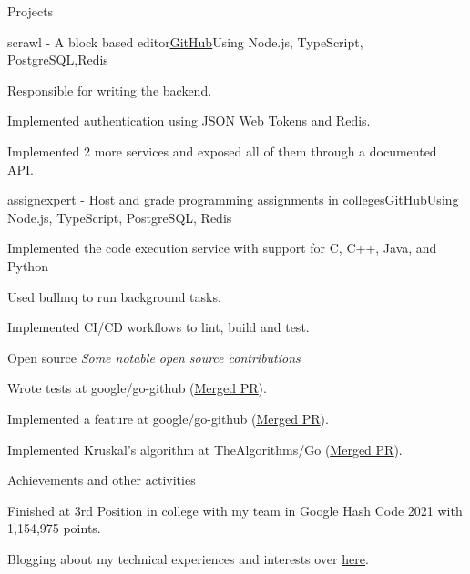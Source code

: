 \documentclass{resume} %
\begin{document}
\begin{rSection}{Projects}

\begin{rSubsection}{scrawl - A block based editor}{\href{https://github.com/taskmasterorg/server}{\underline{GitHub}}}{Using Node.js, TypeScript, PostgreSQL,Redis}{}
\item Responsible for writing the backend.
\item Implemented authentication using JSON Web Tokens and Redis.
\item Implemented 2 more services and exposed all of them through a documented API.
\end{rSubsection}

\begin{rSubsection}{assignexpert - Host and grade programming assignments in colleges}{\href{https://github.com/assignexpert/assignexpert}{\underline{GitHub}}}{Using Node.js, TypeScript, PostgreSQL, Redis}{}
\item Implemented the code execution service with support for C, C++, Java, and Python
\item Used bullmq to run background tasks.
\item Implemented CI/CD workflows to lint, build and test.
\
\end{rSubsection}

\end{rSection}

\begin{rSection}{Open source}
{\emph{Some notable open source contributions}}
\begin{rSubsection}{}{}{}{}
\item Wrote tests at google/go-github (\href{https://GitHub.com/google/go-github/pull/2192}{\underline{Merged PR}}).
\item Implemented a feature at google/go-github (\href{https://GitHub.com/google/go-github/pull/2196}{\underline{Merged PR}}).
\item Implemented Kruskal's algorithm at TheAlgorithms/Go (\href{https://GitHub.com/TheAlgorithms/Go/pull/374}{\underline{Merged PR}}).
\end{rSubsection}
\end{rSection}

\begin{rSection}{Achievements and other activities}
\begin{rSubsection}{}{}{}{}
\item Finished at 3rd Position in college with my team in Google Hash Code 2021 with 1,154,975 points.
\item Blogging about my technical experiences and interests over \href{https://vivekn.dev/blog/}{\underline{here}}.
\end{rSubsection}
\end{rSection}
\end{document}

